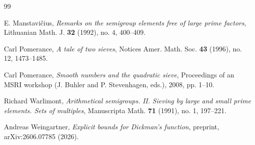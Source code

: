 \documentclass[a4paper]{amsart}
\begin{document}
\begin{thebibliography}{99}

 
E. Manstavi\v{c}ius, \emph{Remarks on the semigroup elements free of large prime factors}, Lithuanian Math. J. \textbf{32} (1992), no. 4, 400--409.
 
Carl Pomerance, \emph{A tale of two sieves}, Notices Amer. Math. Soc. \textbf{43} (1996), no. 12, 1473--1485.
 
Carl Pomerance, \emph{Smooth numbers and the quadratic sieve}, Proceedings of an MSRI workshop (J. Buhler and P. Stevenhagen, eds.), 2008, pp. 1--10.
 
Richard Warlimont, \emph{Arithmetical semigroups. II. Sieving by large and small prime elements. Sets of multiples}, Manuscripta Math. \textbf{71} (1991), no. 1, 197--221.
 
Andreas Weingartner, \emph{Explicit bounds for Dickman's function}, preprint, arXiv:2606.07785 (2026).
 
\end{thebibliography}
\end{document}
